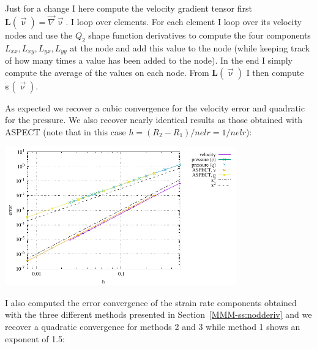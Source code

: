 Just for a change I here compute the velocity gradient tensor first ${\bm L}(\vec\upnu)=\vec\nabla\vec\upnu$.
I loop over elements. For each element I loop over its velocity nodes and use the $Q_2$ 
shape function derivatives to compute the four components $L_{xx},L_{xy},L_{yx},L_{yy}$ at 
the node and add this value to the node (while keeping track of how many times a value
has been added to the node). In the end I simply compute the average of the values
on each node. From ${\bm L}(\vec\upnu)$ I then compute $\dot{\bm \varepsilon}(\vec\upnu)$. 

As expected we recover a cubic convergence for the velocity error and quadratic for the 
pressure. We also recover nearly identical results as those obtained with ASPECT (note that 
in this case $h=(R_2-R_1)/nelr=1/nelr$): 

\begin{center}
\includegraphics[width=10cm]{python_codes/fieldstone_21/results/errors.pdf}
\end{center}

I also computed the error convergence of the strain rate components obtained with 
the three different methods presented in Section~\ref{MMM-ss:nodderiv}
and we recover a quadratic convergence for methods 2 and 3 while method 1 
shows an exponent of 1.5:

